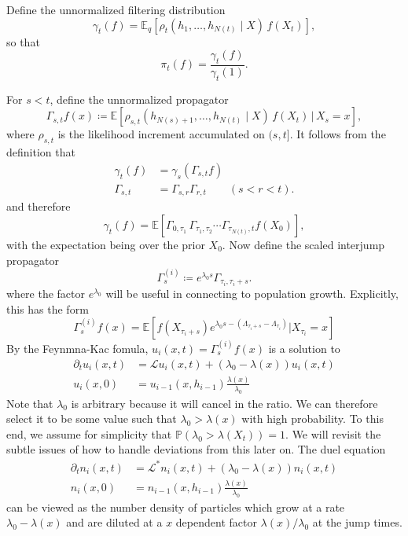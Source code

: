 \documentclass[11pt]{article}
\begin{document}
Define the unnormalized filtering distribution
\begin{equation}
\gamma_t(f)
=
\mathbb E_q\!\left[\rho_t(h_1,\dots,h_{N(t)}\mid X)\,f(X_t)\right],
\end{equation}
so that
\[
\pi_t(f)=\frac{\gamma_t(f)}{\gamma_t(1)}.
\]

For $s<t$, define the unnormalized propagator
\begin{equation}
\Gamma_{s,t} f(x)
\coloneqq
\mathbb E\!\left[
\rho_{s,t}(h_{N(s)+1},\dots,h_{N(t)}\mid X)\,f(X_t) \,\big|\, X_s = x
\right],
\end{equation}
where $\rho_{s,t}$ is the likelihood increment accumulated on $(s,t]$. It follows from the definition that 
\begin{align}
\gamma_t(f)
&= \gamma_s\!\left(\Gamma_{s,t}f\right)\\
\Gamma_{s,t}&= \Gamma_{s,r} \Gamma_{r,t} \qquad (s<r<t).
\end{align}
and therefore 
\begin{equation}
\gamma_t(f)
=
{\mathbb E}[\Gamma_{0,\tau_1}\,
\Gamma_{\tau_1,\tau_2}
\cdots
\Gamma_{\tau_{N(t)},t}f(X_0)],
\end{equation}
with the expectation being over the prior $X_0$.
Now define the scaled interjump propagator
\begin{equation}  
\Gamma_s^{(i)} \coloneqq e^{\lambda_0 s}\Gamma_{\tau_i,\tau_i+ s}. 
\end{equation}
where the factor $e^{\lambda_0}$ will be useful in connecting to population growth. 
Explicitly, this has the form 
\begin{equation}
\Gamma_s^{(i)}f(x) = {\mathbb E}[f(X_{\tau_i + s})e^{\lambda_0 s-(\Lambda_{\tau_i + s}-\Lambda_{\tau_i})}|X_{\tau_i} = x]
\end{equation}
By the Feynmna-Kac fomula, $u_i(x,t) = \Gamma_s^{(i)}f(x)$ is a solution to 
\begin{align}
\partial_t u_i (x,t)&= {\mathcal L}u_i(x,t) + (\lambda_0 - \lambda(x))u_i(x,t)\\
u_i(x,0) &= u_{i-1}(x,h_{i-1})\frac{\lambda(x)}{\lambda_0}
\end{align}
Note that $\lambda_0$ is arbitrary because it will cancel in the ratio. We can therefore select it to be some value such that $\lambda_0 > \lambda(x)$ with high probability. To this end, we assume for simplicity that ${\mathbb P}(\lambda_0> \lambda(X_t))=1$. We will revisit the subtle issues of how to handle deviations from this later on. 
The duel equation 
\begin{align}
\partial_t n_i (x,t)&= {\mathcal L}^*n_i(x,t) + (\lambda_0 - \lambda(x))n_i(x,t)\\
n_i(x,0) &= n_{i-1}(x,h_{i-1})\frac{\lambda(x)}{\lambda_0}
\end{align}
can be viewed as the number density of particles which grow at a rate $\lambda_0 - \lambda(x)$ and are diluted at a $x$ dependent factor $\lambda(x)/\lambda_0$ at the jump times. 
\end{document}
